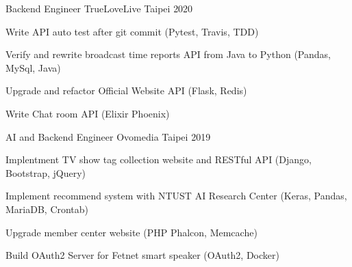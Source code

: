 

\begin{cventries}

  \cventry
    {Backend Engineer} %
    {TrueLoveLive} %
    {Taipei} %
    {2020} %
    {
      \begin{cvitems} %
        \item {Write API auto test after git commit (Pytest, Travis, TDD)}
        \item {Verify and rewrite broadcast time reports API from Java to Python (Pandas, MySql, Java)}
        \item {Upgrade and refactor Official Website API (Flask, Redis)}
        \item {Write Chat room API (Elixir Phoenix)}
      \end{cvitems}
    }

  \cventry
    {AI and Backend Engineer} %
    {Ovomedia} %
    {Taipei} %
    {2019} %
    {
      \begin{cvitems} %
        \item {Implentment TV show tag collection website and RESTful API (Django, Bootstrap, jQuery)}
        \item {Implement recommend system with NTUST AI Research Center (Keras, Pandas, MariaDB, Crontab)}
        \item {Upgrade member center website (PHP Phalcon, Memcache)}
        \item {Build OAuth2 Server for Fetnet smart speaker (OAuth2, Docker)}
      \end{cvitems}
    }

\end{cventries}
